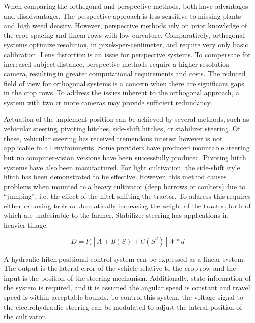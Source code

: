 \documentclass[authoryear]{elsarticle}
\begin{document}
When comparing the orthogonal and perspective methods, both have
advantages and disadvantages. The perspective approach is less
sensitive to missing plants and high weed density. However,
perspective methods rely on prior knowledge of the crop spacing and
linear rows with low curvature. Comparatively, orthogonal systems
optimize resolution, in pixels-per-centimeter, and require very only
basic calibration. Lens distortion is an issue for perspective
systems. To compensate for increased subject distance, perspective
methods require a higher resolution camera, resulting in greater
computational requirements and costs. The reduced field of view for
orthogonal systems is a concern when there are significant gaps in the
crop rows. To address the issues inherent to the orthogonal approach,
a system with two or more cameras may provide sufficient redundancy.

Actuation of the implement position can be achieved by several
methods, such as vehicular steering, pivoting hitches, side-shift
hitches, or stabilizer steering. Of these, vehicular steering has
received tremendous interest however is not applicable in all
environments. Some providers have produced mountable steering but no
computer-vision versions have been successfully produced. Pivoting
hitch systems have also been manufactured. For light cultivation, the
side-shift style hitch has been demonstrated to be effective. However,
this method causes problems when mounted to a heavy cultivator (deep
harrows or coulters) due to “jumping”, i.e. the effect of the hitch
shifting the tractor. To address this requires either removing tools
or dramatically increasing the weight of the tractor, both of which
are undesirable to the farmer. Stabilizer steering has applications in
heavier tillage.

\begin{equation}
  D = F_{i} \left[ A + B(S) + C(S^2) \right] W * d
  \label{eq:soil_resistance}
\end{equation}

A hydraulic hitch positional control system can be expressed as a
linear system. The output is the lateral error of the vehicle relative
to the crop row and the input is the position of the steering
mechanism. Additionally, state-information of the system is required,
and it is assumed the angular speed is constant and travel speed is
within acceptable bounds. To control this system, the voltage signal
to the electrohydraulic steering can be modulated to adjust the
lateral position of the cultivator.
\end{document}
